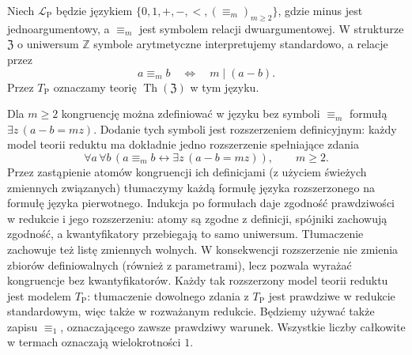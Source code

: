 \begin{definicja}
\label{def:mod-qe-presburger}
Niech $\mathcal L_{\mathrm P}$ będzie językiem
$\{0,1,+,-,<,(\equiv_m)_{m\geq2}\}$, gdzie minus jest
jednoargumentowy, a $\equiv_m$ jest symbolem relacji
dwuargumentowej. W strukturze $\mathfrak Z$ o uniwersum
$\mathbb Z$ symbole arytmetyczne interpretujemy standardowo,
a relacje przez
\[
a\equiv_m b \quad\Longleftrightarrow\quad m\mid(a-b).
\]
Przez $T_{\mathrm P}$ oznaczamy teorię
$\operatorname{Th}(\mathfrak Z)$ w tym języku.
\end{definicja}

Dla $m\geq2$ kongruencję można zdefiniować w języku
bez symboli $\equiv_m$ formułą
$\exists z\,(a-b=mz)$. Dodanie tych symboli jest
rozszerzeniem definicyjnym: każdy model teorii reduktu
ma dokładnie jedno rozszerzenie spełniające zdania
\[
\forall a\,\forall b\,
(a\equiv_m b\leftrightarrow\exists z\,(a-b=mz)),
\qquad m\geq2.
\]
Przez zastąpienie atomów kongruencji ich definicjami
(z użyciem świeżych zmiennych związanych) tłumaczymy
każdą formułę języka rozszerzonego na formułę
języka pierwotnego. Indukcja po formułach daje zgodność
prawdziwości w redukcie i jego rozszerzeniu: atomy
są zgodne z definicji, spójniki zachowują zgodność,
a kwantyfikatory przebiegają to samo uniwersum.
Tłumaczenie zachowuje też listę zmiennych wolnych.
W konsekwencji rozszerzenie nie zmienia zbiorów
definiowalnych (również z parametrami), lecz pozwala
wyrażać kongruencje bez kwantyfikatorów.
Każdy tak rozszerzony model teorii reduktu jest modelem
$T_{\mathrm P}$: tłumaczenie dowolnego zdania z
$T_{\mathrm P}$ jest prawdziwe w redukcie standardowym,
więc także w rozważanym redukcie.
Będziemy używać także zapisu $\equiv_1$, oznaczającego
zawsze prawdziwy warunek. Wszystkie liczby całkowite
w termach oznaczają wielokrotności $1$.

